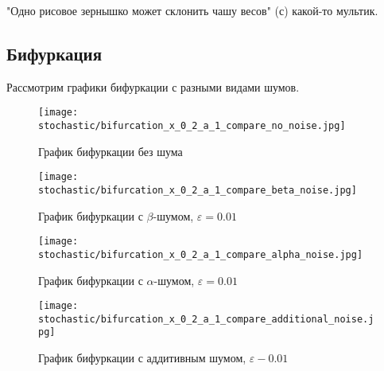         "Одно рисовое зернышко может склонить чашу весов" (с) какой-то мультик.


    \subsection{Бифуркация}

        Рассмотрим графики бифуркации с разными видами шумов.

        \begin{figure}
            \centering
            \texttt{[image: stochastic/bifurcation\_x\_0\_2\_a\_1\_compare\_no\_noise.jpg]}
        
            \captionsetup{justification=centering}
            \caption{График бифуркации без шума}
            \label{bifurcation_x_0_2_a_1_compare_no_noise}
        \end{figure}

        \begin{figure}
            \centering
            \texttt{[image: stochastic/bifurcation\_x\_0\_2\_a\_1\_compare\_beta\_noise.jpg]}
        
            \captionsetup{justification=centering}
            \caption{График бифуркации с \(\beta\)-шумом, \(\varepsilon = 0.01\)}
            \label{bifurcation_x_0_2_a_1_compare_beta_noise}
        \end{figure}

        \begin{figure}
            \centering
            \texttt{[image: stochastic/bifurcation\_x\_0\_2\_a\_1\_compare\_alpha\_noise.jpg]}
        
            \captionsetup{justification=centering}
            \caption{График бифуркации с \(\alpha\)-шумом, \(\varepsilon = 0.01\)}
            \label{bifurcation_x_0_2_a_1_compare_alpha_noise}
        \end{figure}

        \begin{figure}
            \centering
            \texttt{[image: stochastic/bifurcation\_x\_0\_2\_a\_1\_compare\_additional\_noise.jpg]}
        
            \captionsetup{justification=centering}
            \caption{График бифуркации с аддитивным шумом, \(\varepsilon - 0.01\)}
            \label{bifurcation_x_0_2_a_1_compare_additional_noise}
        \end{figure}


